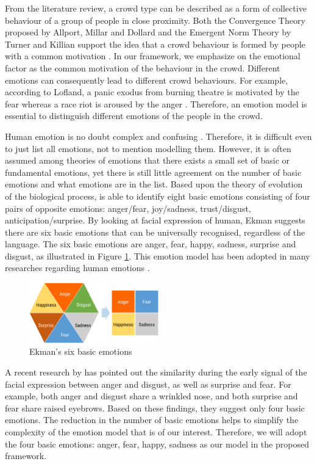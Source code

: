 From the literature review, a crowd type can be described as a form of collective behaviour of a group of people in close proximity. Both the Convergence Theory proposed by Allport, Millar and Dollard and the Emergent Norm Theory by Turner and Killian support the idea that a crowd behaviour is formed by people with a common motivation \citep{mcphail1991myth}. In our framework, we emphasize on the emotional factor as the common motivation of the behaviour in the crowd. Different emotions can consequently lead to different crowd behaviours. For example, according to Lofland, a panic exodus from burning theatre is motivated by the fear whereas a race riot is aroused by the anger \citep{Kornblum2011}. Therefore, an emotion model is essential to distinguish different emotions of the people in the crowd.

Human emotion is no doubt complex and confusing \citet{plutchik2001nature}. Therefore, it is difficult even to just list all emotions, not to mention modelling them. However, it is often assumed among theories of emotions that there exists a small set of basic or fundamental emotions, yet there is still little agreement on the number of basic emotions and what emotions are in the list. Based upon the theory of evolution of the biological process, \citet{plutchik2001integration} is able to identify eight basic emotions consisting of four pairs of opposite emotions: anger/fear, joy/sadness, trust/disgust, anticipation/surprise. By looking at facial expression of human, Ekman suggests there are six basic emotions that can be universally recognised, regardless of the language. The six basic emotions are anger, fear, happy, sadness, surprise and disgust, as illustrated in Figure \ref{fig:emotionModel}. This emotion model has been adopted in many researches regarding human emotions \citep{mohammad2014using, roberts2012empatweet,alm2005emotions}. 

\begin{figure}[htb!]
\centering    
\includegraphics[width=0.5\textwidth]{EkmanModel}
\caption{Ekman's six basic emotions}
\label{fig:emotionModel}
\end{figure}

A recent research by \cite{Jack2014} has pointed out the similarity during the early signal of the facial expression between anger and disgust, as well as surprise and fear. For example, both anger and disgust share a wrinkled nose, and both surprise and fear share raised eyebrows. Based on these findings, they suggest only four basic emotions. The reduction in the number of basic emotions helps to simplify the complexity of the emotion model that is of our interest. Therefore, we will adopt the four basic emotions: anger, fear, happy, sadness as our model in the proposed framework.


